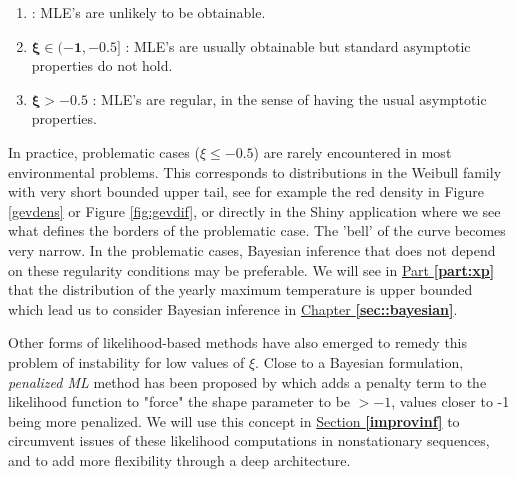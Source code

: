 \begin{enumerate}
	\item\label{it1lik}  : MLE's are unlikely to be obtainable.%
	\item $\boxed{\boldsymbol{\xi\in(-1,-0.5]}}$ : MLE's are usually obtainable but standard asymptotic properties do not hold.
	\item $\boxed{\boldsymbol{\xi>-0.5}}$ : MLE's are regular, in the sense of having the usual asymptotic properties.
\end{enumerate}
In practice, problematic cases ($\xi\leq -0.5$) are rarely encountered in most environmental problems. This corresponds to distributions in the Weibull family with very short bounded upper tail, see for example the red density in Figure \ref{gevdens} or Figure \ref{fig:gevdif}, or directly in the Shiny application where we see what defines the borders of the problematic case. The 'bell' of the curve becomes very narrow.
In the problematic cases, Bayesian inference that does not depend on these regularity conditions may be preferable. We will see in \hyperref[part:xp]{Part \textbf{\ref{part:xp}}} that the distribution of the yearly maximum temperature is upper bounded which lead us to consider Bayesian inference in \hyperref[sec::bayesian]{Chapter \textbf{\ref{sec::bayesian}}}.

Other forms of likelihood-based methods have also emerged to remedy this problem of instability for low values of $\xi$. Close to a Bayesian formulation, \emph{ penalized ML} method has been proposed by \citet{coles_likelihood-based_1999} which adds a penalty term to the likelihood function to "force" the shape parameter to be $>-1$, values closer to -1 being more penalized. We will use this concept in \hyperref[improvinf]{Section \textbf{\ref{improvinf}}} to circumvent issues of these likelihood computations in nonstationary sequences, and to add more flexibility through a deep architecture.

